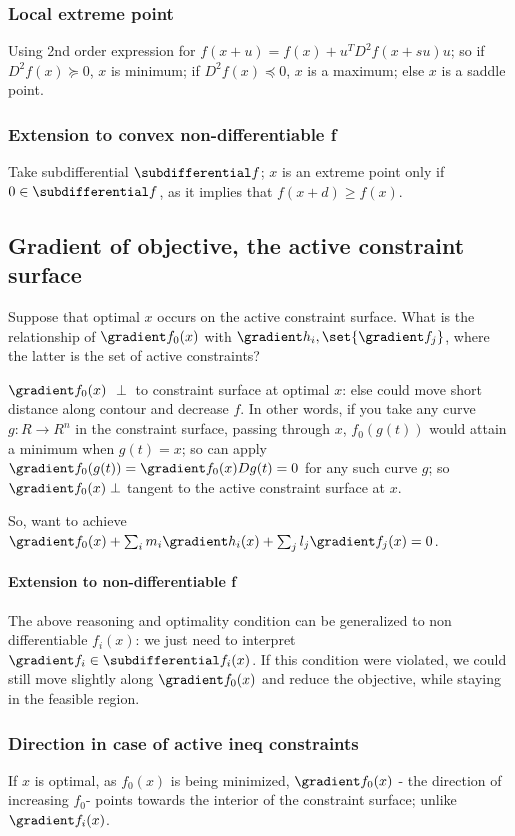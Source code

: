 \documentclass[oneside, article]{memoir}
\begin{document}
\subsubsection{Local extreme point}
Using 2nd order expression for $f(x + u) = f(x) + u^{T}D^{2} f(x+su)u$; so if $D^{2} f(x) \succeq 0$, $x$ is minimum; if $D^{2} f(x) \preceq 0$, $x$ is a maximum; else $x$ is a saddle point.

\subsubsection{Extension to convex non-differentiable f}
Take subdifferential $\subdifferential f$; $x$ is an extreme point only if $0 \in \subdifferential f$, as it implies that $f(x+d) \geq f(x)$.

\subsection{Gradient of objective, the active constraint surface}
Suppose that optimal $x$ occurs on the active constraint surface. What is the relationship of $\gradient f_0(x)$ with $\gradient h_i, \set{\gradient f_j}$, where the latter is the set of active constraints?

$\gradient f_0(x)$ $\perp$ to constraint surface at optimal $x$: else could move short distance along contour and decrease $f$. In other words, if you take any curve $g:R \to R^{n}$ in the constraint surface, passing through $x$, $f_0(g(t))$ would attain a minimum when $g(t) = x$; so can apply $\gradient f_0(g(t)) = \gradient f_0(x) Dg(t)= 0$ for any such curve $g$; so $\gradient f_0(x) \perp$ tangent to the active constraint surface at $x$.

So, want to achieve $\gradient f_0(x) + \sum_i m_i \gradient h_i(x) + \sum_j l_j \gradient f_j(x) = 0$.

\paragraph{Extension to  non-differentiable f}
The above reasoning and optimality condition can be generalized to non differentiable $f_i(x)$: we just need to interpret $\gradient f_i \in \subdifferential f_i(x)$. If this condition were violated, we could still move slightly along $\gradient f_0(x)$ and reduce the objective, while staying in the feasible region.

\subsubsection{Direction in case of active ineq constraints}
If $x$ is optimal, as $f_0(x)$ is being minimized, $\gradient f_0(x)$ - the direction of increasing $f_0$- points towards the interior of the constraint surface; unlike $\gradient f_i(x)$.
\end{document}
